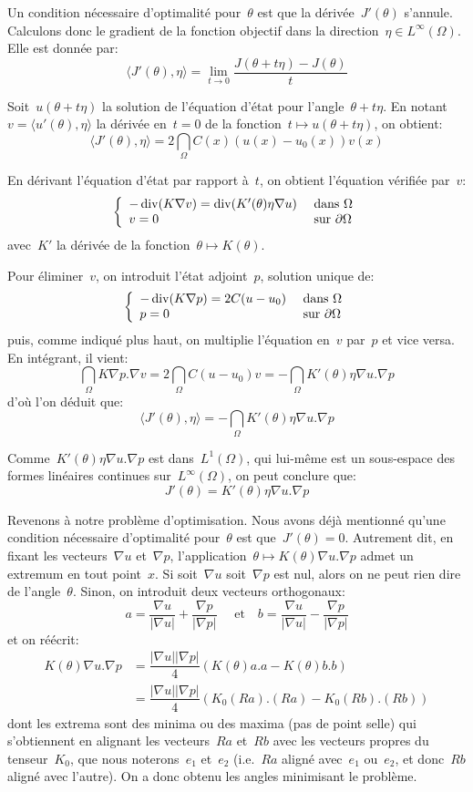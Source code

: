 \medskip
Un condition nécessaire d'optimalité pour~$\theta$ est que la dérivée~$J'(\theta)$ s'annule.
Calculons donc le gradient de la fonction objectif dans la direction~$\eta\in L^\infty(\Omega)$. Elle est donnée par:
\[ \langle J'(\theta),\eta\rangle = \lim_{t\rightarrow0} \dfrac{J(\theta+t\eta)-J(\theta)}{t} \]

Soit~$u(\theta+t\eta)$ la solution de l'équation d'état pour l'angle~$\theta+t\eta$. En notant~$v=\langle u'(\theta),\eta\rangle$ la dérivée en~$t=0$ de la fonction~$t \mapsto u(\theta+t\eta)$, on obtient:
\[ \langle J'(\theta),\eta\rangle = 2\dint_\Omega C(x)(u(x)-u_0(x))v(x) \]

En dérivant l'équation d'état par rapport à~$t$, on obtient l'équation vérifiée par~$v$:
\[\left\{\begin{array}{ll} -\operatorname{div}(K\nabla v)=\operatorname{div}(K'(\theta)\eta\nabla u) &\text{ dans }\Omega \\ v=0 &\text{ sur }\partial\Omega \end{array}\right. \]
avec~$K'$ la dérivée de la fonction~$\theta \mapsto K(\theta)$.

Pour éliminer~$v$, on introduit l'état adjoint~$p$, solution unique de:
\[\left\{\begin{array}{ll} -\operatorname{div}(K\nabla p)=2C(u-u_0) &\text{ dans }\Omega \\ p=0 &\text{ sur }\partial\Omega \end{array}\right. \]
puis, comme indiqué plus haut, on multiplie l'équation en~$v$ par~$p$ et vice versa. En intégrant, il vient:
\[ \dint_\Omega K\nabla p.\nabla v = 2\dint_\Omega C(u-u_0)v = -\dint_\Omega K'(\theta)\eta\nabla u.\nabla p \]
d'où l'on déduit que:
\[ \langle J'(\theta),\eta\rangle =  -\dint_\Omega K'(\theta)\eta\nabla u.\nabla p \]

Comme~$K'(\theta)\eta\nabla u.\nabla p$ est dans~$L^1(\Omega)$, qui lui-même est un sous-espace des formes linéaires continues sur~$L^\infty(\Omega)$, on peut conclure que:
\[ J'(\theta) =  K'(\theta)\eta\nabla u.\nabla p \]

\medskip
Revenons à notre problème d'optimisation. Nous avons déjà mentionné qu'une condition nécessaire d'optimalité pour~$\theta$ est que~$J'(\theta)=0$. Autrement dit, en fixant les vecteurs~$\nabla u$ et~$\nabla p$, l'application~$\theta \mapsto K(\theta)\nabla u.\nabla p$ admet un extremum en tout point~$x$. Si soit~$\nabla u$ soit~$\nabla p$ est nul, alors on ne peut rien dire de l'angle~$\theta$. Sinon, on introduit deux vecteurs orthogonaux:
\[ a=\dfrac{\nabla u}{|\nabla u|}+\dfrac{\nabla p}{|\nabla p|} \quad \text{ et}\quad
b=\dfrac{\nabla u}{|\nabla u|}-\dfrac{\nabla p}{|\nabla p|} \]
et on réécrit:
\[\begin{array}{ll}
K(\theta)\nabla u.\nabla p &= \dfrac{|\nabla u||\nabla p|}{4}(K(\theta)a.a -K(\theta)b.b)\\
&= \dfrac{|\nabla u||\nabla p|}{4}(K_0(Ra).(Ra)-K_0(Rb).(Rb))
\end{array}\]
dont les extrema sont des minima ou des maxima (pas de point selle) qui s'obtiennent en alignant les vecteurs~$Ra$ et~$Rb$ avec les vecteurs propres du tenseur~$K_0$, que nous noterons~$e_1$ et~$e_2$ (i.e.~$Ra$ aligné avec~$e_1$ ou~$e_2$, et donc~$Rb$ aligné avec l'autre).
On a donc obtenu les angles minimisant le problème.

